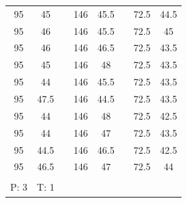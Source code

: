 \documentclass{scrreprt}
\begin{document}
\begin{table}[H]
\begin{tabular}{ccp{1.5cm}ccp{1.5cm}cc}
     95 &         45 &            &      146 &         45.5 &            &         72.5 &         44.5 \\
     95 &         46 &            &      146 &         45.5 &            &         72.5 &         45 \\
     95 &         46 &            &      146 &         46.5 &            &         72.5 &         43.5 \\
     95 &         45 &            &      146 &         48 &              &         72.5 &         43.5 \\
     95 &         44 &            &      146 &         45.5 &            &         72.5 &         43.5 \\
     95 &         47.5 &          &      146 &         44.5 &            &         72.5 &         43.5 \\
     95 &         44 &            &      146 &         48 &            &         72.5 &         42.5 \\
     95 &         44 &            &      146 &         47 &              &         72.5 &        43.5 \\
     95 &         44.5 &          &      146 &         46.5 &            &         72.5 &         42.5 \\
     95 &         46.5 &            &      146 &         47 &            &         72.5 &         44 \\
           &         &            &            &            &            &            &            \\

 P: 3 &   T: 1 &            &            &            &            &            &            \\\cline{1-2}


\end{tabular}
\end{table}
\end{document}
